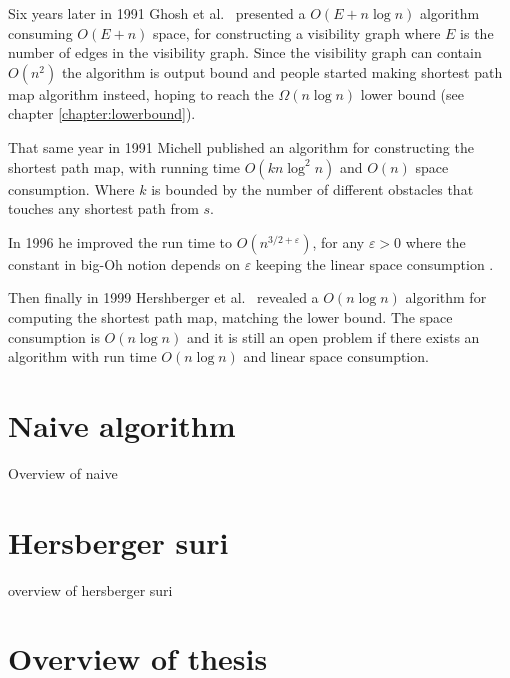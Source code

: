 Six years later in 1991 Ghosh et al.\ \cite{GhoshM91} presented a $O(E+n\log n)$
algorithm consuming $O(E+n)$ space, for constructing a visibility graph where
$E$ is the number of edges in the visibility graph.
Since the visibility graph can contain $O(n^2)$ the algorithm is output bound
and people started making shortest path map algorithm insteed, hoping to reach
the $\Omega{(n\log n)}$ lower bound (see chapter \ref{chapter:lowerbound}).

That same year in 1991 Michell \cite{DBLP:journals/amai/Mitchell91} published
an algorithm for constructing the shortest path map, with running time
$O(kn\log^2 n)$ and $O(n)$ space consumption. Where $k$ is bounded by the
number of different obstacles that touches any shortest path from $s$.

In 1996 he improved the run time to $O(n^{3/2+\varepsilon})$, for any
$\varepsilon>0$ where the constant in big-Oh notion depends on $\varepsilon$
keeping the linear space consumption  \cite{DBLP:journals/ijcga/Mitchell96}.

Then finally in 1999 Hershberger et al.\ \cite{HershbergerS99} revealed a
$O(n\log n)$ algorithm for computing the shortest path map, matching the lower
bound. The space consumption is $O(n\log n)$ and it is still an open problem if
there exists an algorithm with run time $O(n\log n)$ and linear space
consumption.

\section{Naive algorithm}
Overview of naive
\section{Hersberger suri}
overview of hersberger suri

\section{Overview of thesis}
